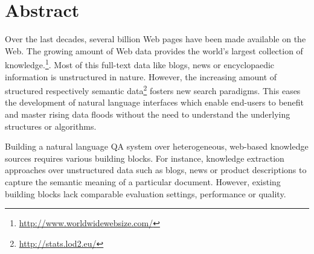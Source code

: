 \chapter*{Abstract}
Over the last decades, several billion Web pages have been made available on the Web. 
The growing amount of Web data provides the world's largest collection of knowledge.\footnote{\url{http://www.worldwidewebsize.com/}}. 
Most of this full-text data like blogs, news or encyclopaedic information is unstructured in nature.
However, the increasing amount of structured respectively semantic data\footnote{\url{http://stats.lod2.eu/}} fosters new search paradigms.
This eases the development of natural language interfaces which enable end-users to benefit and master rising data floods without the need to understand the underlying structures or algorithms.

Building a natural language \ac{QA} system over heterogeneous, web-based knowledge sources requires various building blocks.
For instance, knowledge extraction approaches over unstructured data such as blogs, news or product descriptions to capture the semantic meaning of a particular document.
However, existing building blocks lack comparable evaluation settings, performance or quality. 

